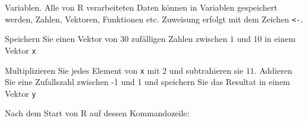 Variablen. Alle von R verarbeiteten Daten können in Variablen
gespeichert werden, Zahlen, Vektoren, Funktionen etc. Zuweisung
erfolgt mit dem Zeichen {\tt <-}.
\begin{teilaufgaben}
\item
Speichern Sie einen Vektor
von 30 zufälligen Zahlen zwischen $1$ und $10$ in einem Vektor
{\tt x}
\item Multiplizieren Sie jedes Element von {\tt x} mit 2 und subtrahieren
sie $11$. Addieren Sie eine Zufallszahl zwischen -1 und 1 und speichern Sie
das Resultat in einem Vektor {\tt y}
\end{teilaufgaben}


\begin{loesung}
Nach dem Start von R auf dessen Kommandozeile:
\end{loesung}

